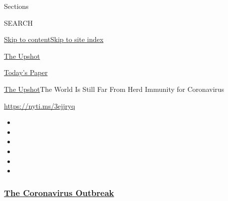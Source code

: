 Sections

SEARCH

\protect\hyperlink{site-content}{Skip to
content}\protect\hyperlink{site-index}{Skip to site index}

\href{https://www.nytimes3xbfgragh.onion/section/upshot}{The Upshot}

\href{https://myaccount.nytimes3xbfgragh.onion/auth/login?response_type=cookie\&client_id=vi}{}

\href{https://www.nytimes3xbfgragh.onion/section/todayspaper}{Today's
Paper}

\href{/section/upshot}{The Upshot}\textbar{}The World Is Still Far From
Herd Immunity for Coronavirus

\url{https://nyti.ms/3ejjryq}

\begin{itemize}
\item
\item
\item
\item
\item
\item
\end{itemize}

\hypertarget{the-coronavirus-outbreak}{%
\subsubsection{\texorpdfstring{\href{https://www.nytimes3xbfgragh.onion/news-event/coronavirus?name=styln-coronavirus-national\&region=TOP_BANNER\&block=storyline_menu_recirc\&action=click\&pgtype=Interactive\&impression_id=b5442d30-efb3-11ea-a1b4-338358db981a\&variant=undefined}{The
Coronavirus
Outbreak}}{The Coronavirus Outbreak}}\label{the-coronavirus-outbreak}}

